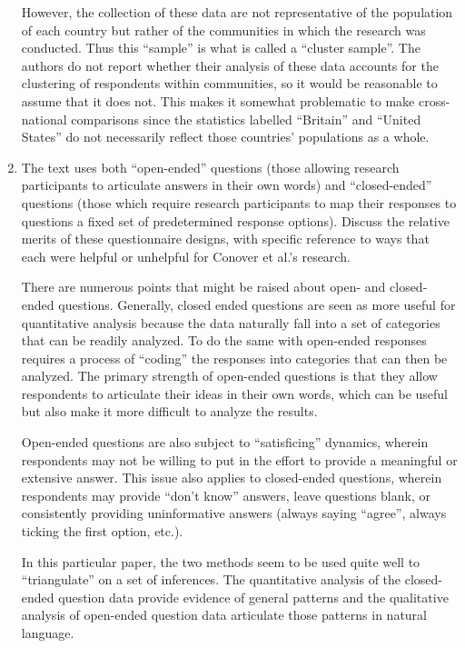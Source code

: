 \documentclass[a4paper]{exam}
\begin{document}
\begin{enumerate}
\begin{solution}
However, the collection of these data are not representative of the population of each country but rather of the communities in which the research was conducted. Thus this ``sample'' is what is called a ``cluster sample''. The authors do not report whether their analysis of these data accounts for the clustering of respondents within communities, so it would be reasonable to assume that it does not. This makes it somewhat problematic to make cross-national comparisons since the statistics labelled ``Britain'' and ``United States'' do not necessarily reflect those countries' populations as a whole.

\end{solution}

\item The text uses both ``open-ended'' questions (those allowing research participants to articulate answers in their own words) and ``closed-ended'' questions (those which require research participants to map their responses to questions a fixed set of predetermined response options). Discuss the relative merits of these questionnaire designs, with specific reference to ways that each were helpful or unhelpful for Conover et al.'s research.

\begin{solution}

There are numerous points that might be raised about open- and closed-ended questions. Generally, closed ended questions are seen as more useful for quantitative analysis because the data naturally fall into a set of categories that can be readily analyzed. To do the same with open-ended responses requires a process of ``coding'' the responses into categories that can then be analyzed. The primary strength of open-ended questions is that they allow respondents to articulate their ideas in their own words, which can be useful but also make it more difficult to analyze the results.

Open-ended questions are also subject to ``satisficing'' dynamics, wherein respondents may not be willing to put in the effort to provide a meaningful or extensive answer. This issue also applies to closed-ended questions, wherein respondents may provide ``don't know'' answers, leave questions blank, or consistently providing uninformative answers (always saying ``agree'', always ticking the first option, etc.).

In this particular paper, the two methods seem to be used quite well to ``triangulate'' on a set of inferences. The quantitative analysis of the closed-ended question data provide evidence of general patterns and the qualitative analysis of open-ended question data articulate those patterns in natural language.


\end{solution}
\end{enumerate}
\end{document}
